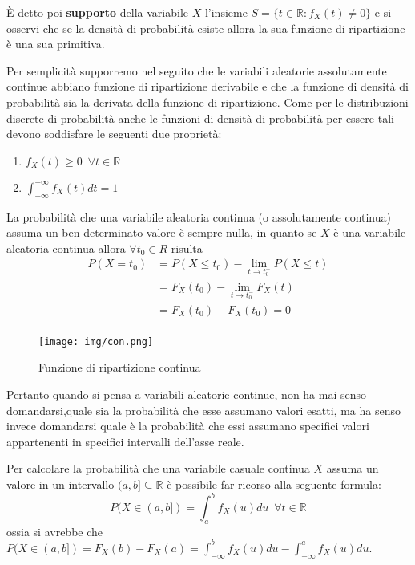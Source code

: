 \documentclass[a4paper,12pt, oneside]{book}
\newcommand{\numberset}{\mathbb}
\newcommand{\R}{\numberset{R}}
\begin{document}
È detto poi \textbf{supporto} della variabile $X$ l'insieme $S = \{t \in \R : f_X(t) \neq 0\}$
e si osservi che se la densità di probabilità esiste allora la sua funzione di ripartizione è una sua
primitiva.

Per semplicità supporremo nel seguito che le variabili aleatorie assolutamente continue abbiano funzione
di ripartizione derivabile e che la funzione di densità di probabilità sia la derivata della funzione di ripartizione.\newline
Come per le distribuzioni discrete di probabilità anche le funzioni di densità di probabilità 
per essere tali devono soddisfare le seguenti due proprietà:
\begin{enumerate}
    \item $f_X(t) \geq 0\,\,\, \forall t \in \R$
    \item $\int _{-\infty}^{+\infty} f_X(t)dt = 1$
\end{enumerate}
La probabilità che una variabile aleatoria continua (o assolutamente continua) assuma un ben determinato valore
è sempre nulla, in quanto se $X$ è una variabile aleatoria continua allora $\forall t_0 \in R$ risulta
\[ \begin{split}
    P(X = t_0) & = P(X \leq t_0) - \lim _{t \to t_0^-} P(X \leq t) \\
               & = F_X(t_0) - \lim_{t \to t_0^-} F_X(t) \\
               & = F_X(t_0) - F_X(t_0) = 0\\
   \end{split} \]

\begin{figure}
    \centering
    \caption{Funzione di ripartizione continua}
    \label{img:ripartizioneContinua}
    \texttt{[image: img/con.png]}
\end{figure}
Pertanto quando si pensa a variabili aleatorie continue, non ha mai senso domandarsi,quale sia la probabilità
che esse assumano valori esatti, ma ha senso invece domandarsi quale è la probabilità che essi assumano
specifici valori appartenenti in specifici intervalli dell'asse reale.

Per calcolare la probabilità che una variabile casuale continua $X$ assuma un valore in un intervallo 
$(a,b] \subseteq \R$ è possibile far ricorso alla seguente formula:
\[ P(X \in (a,b]) = \int _a ^b f_X(u)du\,\,\, \forall t \in \R\]
ossia si avrebbe che $P(X \in (a, b]) = F_X(b) - F_X(a) = \int_{-\infty}^b f_X(u)du - \int_{-\infty}^a f_X(u)du$.
\end{document}

